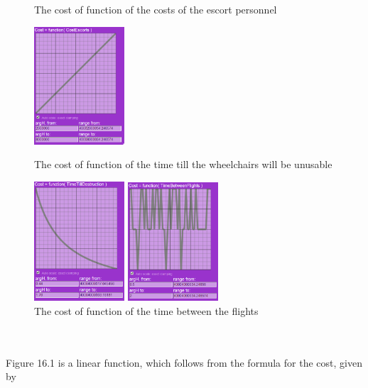 \documentclass[a4paper, 11pt, notitlepage]{report}
\begin{document}
\begin{figure}[!h]
\caption{The cost of function of the costs of the escort personnel}
\includegraphics[width=0.3\textwidth]{figures/cost(CE)}
\caption{The cost of function of the time till the wheelchairs will be unusable}
\includegraphics[width=0.3\textwidth]{figures/cost(TTD)}
\caption{The cost of function of the time between the flights}
\includegraphics[width=0.3\textwidth]{figures/cost(TBF)}
\end{figure}
\\ \\
Figure 16.1 is a linear function, which follows from the formula for the cost, given by
\end{document}
